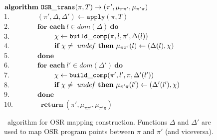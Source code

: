 \else
\begin{figure}
\noindent
\begin{small}
\hphantom{xxx} $\textbf{algorithm}~\text{${\tt OSR\_trans}$}(\pi, T)\rightarrow (\pi',\mu_{\pi\pi'},\mu_{\pi'\pi})$ \\
1.\hphantom{0} ~~ ~~~~ $(\pi',\Delta,\Delta')\gets \texttt{apply}(\pi,T)$ \\
2.\hphantom{0} ~~ ~~~~ $\textbf{for each}~l\in dom(\Delta)~\textbf{do}$ \\
3.\hphantom{0} ~~ ~~~~ ~~~~ $\chi\gets\text{${\tt build\_comp}$}(\pi,l,\pi',\Delta(l))$ \\
4.\hphantom{0} ~~ ~~~~ ~~~~ $\textbf{if}~\chi\neq~unde\hspace{-0.1em}f~\textbf{then}~\mu_{\pi\pi'}(l)\gets(\Delta(l),\chi)$ \\
5.\hphantom{0} ~~ ~~~~ $\textbf{done}$\\
6.\hphantom{0} ~~ ~~~~ $\textbf{for each}~l'\in dom(\Delta')~\textbf{do}$ \\
7.\hphantom{0} ~~ ~~~~ ~~~~ $\chi\gets\text{${\tt build\_comp}$}(\pi',l',\pi,\Delta'(l'))$ \\
8.\hphantom{0} ~~ ~~~~ ~~~~ $\textbf{if}~\chi\neq~unde\hspace{-0.1em}f~\textbf{then}~\mu_{\pi'\pi}(l')\gets(\Delta'(l'),\chi)$ \\
9.\hphantom{0} ~~ ~~~~ $\textbf{done}$\\
10. ~~ ~~~~ $\textbf{return}~(\pi',\mu_{\pi\pi'},\mu_{\pi'\pi})$ \\
\end{small}
\caption{\osrtrans\ algorithm for OSR mapping construction. Functions $\Delta$ and $\Delta'$ are used to map OSR program points between $\pi$ and $\pi'$ (and viceversa).}
\label{alg:osr-trans}
\end{figure}
\fi


